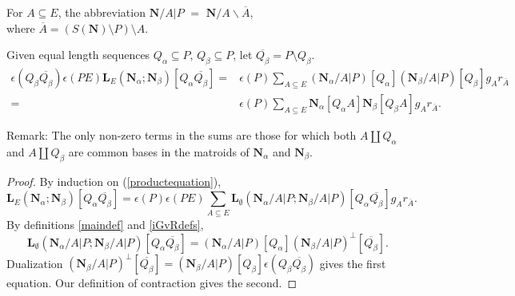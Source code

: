 \documentclass[Unicode]{cedram-alco}
\newcommand{\ext}[1]{\ensuremath{\mathbf{#1}}}
\newcommand{\eNal}{\ensuremath{\ext{N}_{\alpha}}}
\newcommand{\eNbe}{\ensuremath{\ext{N}_\beta}}
\newcommand{\dunion}{\coprod}
\newcommand{\extLHorSub}[3]{\ext{L}_{#1}\left(  {#2}; {#3}  \right)}
\begin{document}
\begin{defi}\label{NcontrArestrictP}
For $A\subseteq E$, the abbreviation $\ext{N}/A|P$ $=$
$\ext{N}/A\backslash \overline{A}$, \\
where $\overline{A}=(S(\ext{N})\setminus P)\setminus A$.
\end{defi}




\begin{coro} Given 
  equal length sequences $Q_\alpha \subseteq P$, $Q_\beta \subseteq P$,
  let $\overline{Q_\beta}=P\setminus Q_\beta$.
\label{common-basis-expansion}
\begin{equation}
  \begin{split}
    \epsilon(  Q_\beta \overline{Q_\beta} )\epsilon(PE)
    \extLHorSub{E}{\eNal}{\eNbe}  [Q_{\alpha}\overline{Q_{\beta}}]
    =& 
    \epsilon(P)\sum_{A\subseteq E}
    (\ext{N}_\alpha/A|P) [Q_\alpha]
    (\ext{N}_\beta/A|P) [Q_\beta] g_Ar_{\overline{A}} \\
    =& 
    \epsilon(P)\sum_{A\subseteq E}
    \ext{N}_\alpha[Q_\alpha A]
    \ext{N}_\beta [Q_\beta A]
    g_Ar_{\overline{A}}.
  \end{split}
\end{equation}

\end{coro}
Remark: The only non-zero terms in the sums are those for which both $A\dunion Q_\alpha$
and $A\dunion Q_\beta$ are common bases in the matroids of $\ext{N}_\alpha$ and $\ext{N}_\beta$.

\begin{proof}
  By induction on (\ref{productequation}),
  \[
  \extLHorSub{E}{\eNal}{\eNbe}  [Q_{\alpha}\overline{Q_{\beta}}] = \epsilon(P)\epsilon(PE)
  \sum_{A\subseteq E}\extLHorSub{\emptyset}{\ext{N}_\alpha/A|P}{\ext{N}_\beta/A|P}[Q_{\alpha}\overline{Q_{\beta}}]
  g_Ar_{\overline{A}}.
  \]
By definitions \ref{maindef} and \ref{iGvRdefs}, 
  \[
\extLHorSub{\emptyset}{\ext{N}_\alpha/A|P}{\ext{N}_\beta/A|P}[Q_{\alpha}\overline{Q_{\beta}}]
=(\ext{N}_\alpha/A|P)[Q_\alpha](\ext{N}_\beta/A|P)^\perp[\overline{Q_{\beta}}].
\]
Dualization $(\ext{N}_\beta/A|P)^\perp[\overline{Q_{\beta}}]=
(\ext{N}_\beta/A|P)[Q_{\beta}]\epsilon(Q_\beta\overline{Q_\beta})$ gives the first equation.
Our definition of contraction gives the second.
\end{proof}
\end{document}
